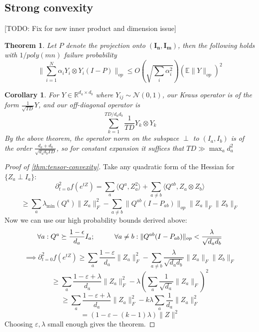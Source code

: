 \documentclass{article}
\newtheorem{theorem}{Theorem}
\newtheorem{corollary}{Corollary}
\newcommand{\R}{{\mathbb{R}}}
\renewcommand{\vec}{\bm}
\newcommand{\E}{\mathbb{E}}
\newcommand\eps{\varepsilon}
\newcommand{\CF}[1]{{\color{purple}[CF: #1]}}
\newcommand{\TODO}[1]{{\color{blue}[TODO: #1]}}
\begin{document}
 



\subsection{Strong convexity}
\TODO{Fix for new inner product and dimension issue}


\begin{theorem}
Let $P$ denote the projection onto $(\vec{I_{n}},\vec{I_{m}})$, then the following holds with $1/poly(mn)$ failure probability
\[ \|\sum_{i=1}^{N} \alpha_{i} Y_{i} \otimes Y_{i} (I - P) \|_{op} \leq O \left( \sqrt{\sum_{i} \alpha_{i}^{2}} \right) \left( \E \|Y\|_{op} \right)^{2} \]
\end{theorem}

\begin{corollary}
For $Y \in \R^{d_{a} \times d_{b}}$ where $Y_{ij} \sim \mathcal{N}(0,1)$, our Kraus operator is of the form $\frac{1}{\sqrt{TD}} Y$, and our off-diagonal operator is
\[ \sum_{k=1}^{TD/d_{a}d_{b}} \frac{1}{TD} Y_{k} \otimes Y_{k}   \]
By the above theorem, the operator norm on the subspace $\perp$ to $(I_{a},I_{b})$ is of the order $\frac{d_{a}+d_{b}}{\sqrt{d_{a} d_{b} TD}}$, so for constant expansion it suffices that $TD \gg \max_{a} d_{a}^{2}$
\end{corollary}

\begin{proof} [Proof of \cref{thm:tensor-convexity}]
Take any quadratic form of the Hessian for $\{Z_{a} \perp I_{a}\}$:
\[ \partial_{t=0}^{2} f(e^{t Z}) = \sum_{a} \langle Q^{a}, Z_{a}^{2} \rangle + \sum_{a \neq b} \langle Q^{ab}, Z_{a} \otimes Z_{b} \rangle   \]
\[ \geq \sum_{a} \lambda_{\min}(Q^{a}) \|Z_{a}\|_{F}^{2} - \sum_{a \neq b} \|Q^{ab} (I-P_{ab})\|_{op} \|Z_{a}\|_{F} \|Z_{b}\|_{F}    \]
Now we can use our high probability bounds derived above:
\[ \forall a: Q^{a} \succeq \frac{1-\epsilon}{d_{a}} I_{a}; \hspace{10mm} 
\forall a \neq b: \|Q^{ab} (I-P_{ab})\|_{op} < \frac{\lambda}{\sqrt{d_{a} d_{b}}}   \]
\[ \implies \partial_{t=0}^{2} f(e^{t Z}) \geq \sum_{a} \frac{1-\eps}{d_{a}} \|Z_{a}\|_{F}^{2} - \sum_{a \neq b} \frac{\lambda}{\sqrt{d_{a} d_{b}}} \|Z_{a}\|_{F} \|Z_{b}\|_{F}  \]
\[ \geq \sum_{a} \frac{1-\eps+\lambda}{d_{a}} \|Z_{a}\|_{F}^{2} - \lambda \left( \sum_{a} \frac{1}{\sqrt{d_{a}}} \|Z_{a}\|_{F}   \right)^{2}   \]
\[ \geq \sum_{a} \frac{1-\eps+\lambda}{d_{a}} \|Z_{a}\|_{F}^{2} - k\lambda \sum_{a} \frac{1}{d_{a}} \|Z_{a}\|_{F}^{2} \]
\[ = (1-\eps-(k-1)\lambda) \|Z\|^{2}    \]
Choosing $\eps,\lambda$ small enough gives the theorem. 
\end{proof}
\end{document}
